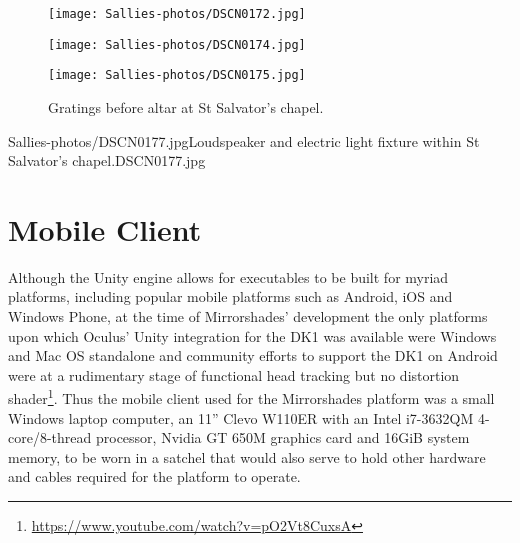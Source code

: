\begin{figure}[h]
    \begin{center}
    \begin{minipage}{.32\textwidth}
        \begin{center}
        \texttt{[image: Sallies-photos/DSCN0172.jpg]}
        \caption{St Salvator's chapel aisle, flanked by gratings.}
        \label{DSCN0172.jpg}
        \end{center}
    \end{minipage}%
    \hspace{.01\textwidth}
    \begin{minipage}{.32\textwidth}
		\begin{center}
        \texttt{[image: Sallies-photos/DSCN0174.jpg]}
        \caption{Detail of St Salvator's chapel gratings.}
        \label{DSCN0174.jpg}
        \end{center}
    \end{minipage}%
    \hspace{.01\textwidth}
    \begin{minipage}{.32\textwidth}
        \begin{center}
        \texttt{[image: Sallies-photos/DSCN0175.jpg]}
        \caption{Gratings before altar at St Salvator's chapel.}
        \label{DSCN0175.jpg}
        \end{center}
    \end{minipage}
    \end{center}
\end{figure}

       {Sallies-photos/DSCN0177.jpg}{Loudspeaker and electric light fixture within St Salvator's chapel.}{DSCN0177.jpg}
       

\section{Mobile Client}
\label{mobile-client}
Although the Unity engine allows for executables to be built for myriad platforms, including popular mobile platforms such as Android, iOS and Windows Phone, at the time of Mirrorshades' development the only platforms upon which Oculus' Unity integration for the DK1 was available were Windows and Mac OS standalone and community efforts to support the DK1 on Android were at a rudimentary stage of functional head tracking but no distortion shader\footnote{\url{https://www.youtube.com/watch?v=pO2Vt8CuxsA}}. Thus the mobile client used for the Mirrorshades platform was a small Windows laptop computer, an 11'' Clevo W110ER with an Intel i7-3632QM 4-core/8-thread processor, Nvidia GT 650M graphics card and 16GiB system memory, to be worn in a satchel that would also serve to hold other hardware and cables required for the platform to operate.

